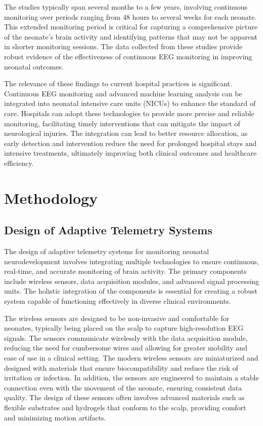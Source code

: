 \documentclass[12pt,journal,compsoc]{IEEEtran}
\begin{document}
The studies typically span several months to a few years, involving continuous monitoring over periods ranging from 48 hours to several weeks for each neonate. This extended monitoring period is critical for capturing a comprehensive picture of the neonate's brain activity and identifying patterns that may not be apparent in shorter monitoring sessions. The data collected from these studies provide robust evidence of the effectiveness of continuous EEG monitoring in improving neonatal outcomes.

The relevance of these findings to current hospital practices is significant. Continuous EEG monitoring and advanced machine learning analysis can be integrated into neonatal intensive care units (NICUs) to enhance the standard of care. Hospitals can adopt these technologies to provide more precise and reliable monitoring, facilitating timely interventions that can mitigate the impact of neurological injuries. The integration can lead to better resource allocation, as early detection and intervention reduce the need for prolonged hospital stays and intensive treatments, ultimately improving both clinical outcomes and healthcare efficiency.

\section{Methodology}

\subsection{Design of Adaptive Telemetry Systems}

The design of adaptive telemetry systems for monitoring neonatal neurodevelopment involves integrating multiple technologies to ensure continuous, real-time, and accurate monitoring of brain activity. The primary components include wireless sensors, data acquisition modules, and advanced signal processing units. The holistic integration of the components is essential for creating a robust system capable of functioning effectively in diverse clinical environments.

The wireless sensors are designed to be non-invasive and comfortable for neonates, typically being placed on the scalp to capture high-resolution EEG signals. The sensors communicate wirelessly with the data acquisition module, reducing the need for cumbersome wires and allowing for greater mobility and ease of use in a clinical setting. The modern wireless sensors are miniaturized and designed with materials that ensure biocompatibility and reduce the risk of irritation or infection. In addition, the sensors are engineered to maintain a stable connection even with the movement of the neonate, ensuring consistent data quality. The design of these sensors often involves advanced materials such as flexible substrates and hydrogels that conform to the scalp, providing comfort and minimizing motion artifacts. 
\end{document}
